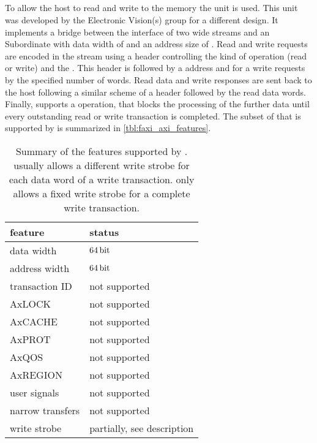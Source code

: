 \subsection{\FAXI{}}
To allow the host to read and write to the \DDR{} memory the \FAXI{} unit is used. This unit was developed by the Electronic Vision(s) group for a different \FPGA{} design. It implements a bridge between the \HostARQ{} \FPGA{} interface of two \PhyWordSize{} wide streams and an \AXI{} Subordinate with data width of \PhyWordSize{} and an address size of \PhyWordSize{}.
Read and write requests are encoded in the \HostARQ{} stream using a \PhyWordSize{} header controlling the kind of operation (read or write) and the \burstsize{}. This header is followed by a \PhyWordSize{} address and for a write requests by the specified number of \PhyWordSize{} words.
Read data and write responses are sent back to the host following a similar scheme of a \PhyWordSize{} header followed by the read data words.
Finally, \FAXI{} supports a \globalfence{} operation, that blocks the processing of the further data until every outstanding read or write transaction is completed. The subset of \AXI{} that is supported by \flangedram{} is summarized in \autoref{tbl:faxi_axi_features}.

\begin{table}
  \begin{center}
\begin{tabular}{ll}
  \toprule
  feature & status  \\
  \midrule
  data width & $\SI{64}{\bit}$ \\
  address width & $\SI{64}{\bit}$ \\
  transaction ID & not supported \\
  AxLOCK & not supported \\
  AxCACHE & not supported \\
  AxPROT & not supported \\
  AxQOS & not supported \\
  AxREGION & not supported \\
  user signals & not supported \\
  narrow transfers & not supported \\
  write strobe & partially, see description \\
  \bottomrule
\end{tabular}

  \end{center}
\caption{Summary of the \AXI{} features supported by \FAXI{}. \AXI{} usually allows a different write strobe for each data word of a write transaction. \FAXI{} only allows a fixed write strobe for a complete write transaction.}\label{tbl:faxi_axi_features}
\end{table}

